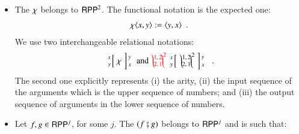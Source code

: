 \begin{definition}
\begin{itemize}
\item 
The \rprSwapName $ \chi $ belongs to $ \mathsf{RPP}^{2}$.
The functional notation is the expected one:
\begin{align*}
\chi \langle x,y\rangle := \langle y,x\rangle
\enspace .
\end{align*}
We use two interchangeable relational notations:
\begin{align*}
\arraycolsep=1.4pt
\begin{array}{rcl}
\left. {\scriptsize \begin{array}{r} 
	x\\ y
	\end{array}} \right[  &
\rprBSwap 
& \left] {\scriptsize \begin{array}{l}
	y\\[0.35mm] x
	\end{array} } \right.
\end{array}
  \textrm{ and  }
  \textcolor{red}{ \rprSwap{2} {1,2} {2,1} } %
  \begin{array}{rcl}
\left. {\scriptsize \begin{array}{r} 
	x\\ y
                    \end{array}} \right[  &\rprSwap{2} {1,2} {2,1}
  & \left] {\scriptsize \begin{array}{l}
	y\\[0.35mm] x
	\end{array} } \right.
  \end{array}
\enspace .
\end{align*}
The second one explicitly represents
 (i) the arity,
(ii) the input sequence of the arguments which is the upper sequence of numbers; 
and (iii) the output sequence of arguments in the lower sequence of numbers.
\item 
Let $ f, g\in\mathsf{RPP}^{j}$, for some $ j $.
The \rprSComName $ (f\fatsemi g)$ belongs to $ \mathsf{RPP}^{j} $ and is such that:

\end{itemize}
\end{definition}
